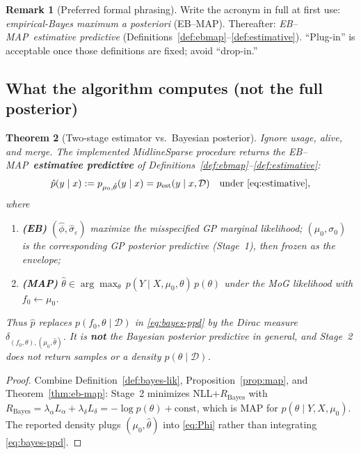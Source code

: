 \documentclass[11pt,a4paper]{article}
\theoremstyle{plain}
\newtheorem{theorem}{Theorem}[section]
\theoremstyle{definition}
\newtheorem{remark}[theorem]{Remark}
\theoremstyle{remark}
\newcommand{\D}{\mathcal{D}}
\newcommand{\tht}{\theta}
\newcommand{\EBMAP}{EB--MAP}
\begin{document}
\begin{remark}[Preferred formal phrasing]
Write the acronym in full at first use:
\emph{empirical-Bayes maximum a posteriori} (\EBMAP).
Thereafter: \emph{\EBMAP\ estimative predictive}
(Definitions~\ref{def:ebmap}--\ref{def:estimative}).
``Plug-in'' is acceptable once those definitions are fixed; avoid ``drop-in.''
\end{remark}

\subsection{What the algorithm computes (not the full posterior)}
\begin{theorem}[Two-stage estimator vs.\ Bayesian posterior]
\label{thm:bayes-vs-algo}
Ignore usage, alive, and merge. The implemented MidlineSparse procedure returns
the \EBMAP\ \textbf{estimative predictive} of Definitions~\ref{def:ebmap}--\ref{def:estimative}:
\begin{equation}
  \hat p(y\mid x)
  :=
  p_{\mu_0,\hat\tht}(y\mid x)
  =
  p_{\mathrm{est}}(y\mid x,\D)
  \quad\text{under }\eqref{eq:estimative},
\end{equation}
where
\begin{enumerate}[label=(\roman*)]
  \item \textbf{(EB)} \((\hat\phi,\hat\sigma_\varepsilon)\) maximize the misspecified GP
        marginal likelihood; \((\mu_0,\sigma_0)\) is the corresponding GP posterior
        predictive (Stage~1), then frozen as the envelope;
  \item \textbf{(MAP)} \(\hat\tht\in\arg\max_\tht\, p(Y\mid X,\mu_0,\tht)\,p(\tht)\)
        under the MoG likelihood with \(f_0\leftarrow\mu_0\).
\end{enumerate}
Thus \(\hat p\) replaces \(p(f_0,\tht\mid\D)\) in \eqref{eq:bayes-ppd} by the
Dirac measure \(\delta_{(f_0,\tht),(\mu_0,\hat\tht)}\).
It is \textbf{not} the Bayesian posterior predictive in general, and Stage~2 does
not return samples or a density \(p(\tht\mid\D)\).
\end{theorem}

\begin{proof}
Combine Definition~\ref{def:bayes-lik}, Proposition~\ref{prop:map}, and
Theorem~\ref{thm:eb-map}: Stage~2 minimizes NLL\(+R_{\mathrm{Bayes}}\) with
\(R_{\mathrm{Bayes}}=\lambda_\alpha L_\alpha+\lambda_\delta L_\delta=-\log p(\tht)+\mathrm{const}\),
which is MAP for \(p(\tht\mid Y,X,\mu_0)\). The reported density plugs
\((\mu_0,\hat\tht)\) into \eqref{eq:Phi} rather than integrating
\eqref{eq:bayes-ppd}.
\end{proof}
\end{document}
